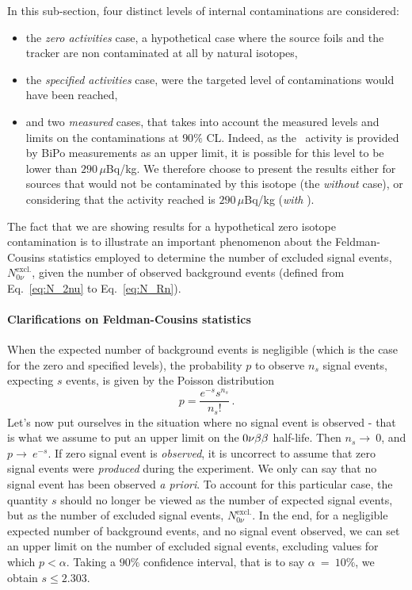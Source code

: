 In this sub-section, four distinct levels of internal contaminations are considered:
\begin{itemize}
\item the \emph{zero activities} case, a hypothetical case where the source foils and the tracker are non contaminated at all by natural isotopes,
\item the \emph{specified activities} case, were the targeted level of contaminations would have been reached,
\item and two \emph{measured} cases,  that takes into account the measured levels and limits on the contaminations at $90\%$ CL.
  Indeed, as the \Bi\ activity is provided by BiPo measurements as an upper limit, it is possible for this level to be lower than $290\,\mu$Bq/kg.
  We therefore choose to present the results either for sources that would not be contaminated by this isotope (the \emph{without \Bi} case), or considering that the activity reached is $290\,\mu$Bq/kg (\emph{with \Bi}).
\end{itemize}
The fact that we are showing results for a hypothetical zero isotope contamination is to illustrate an important phenomenon about the Feldman-Cousins statistics employed to determine the number of excluded signal events, $N_{0\nu}^{\text{excl.}}$, given the number of observed background events (defined from Eq.~\eqref{eq:N_2nu} to Eq.~\eqref{eq:N_Rn}).

\paragraph{Clarifications on Feldman-Cousins statistics}
When the expected number of background events is negligible (which is the case for the zero and specified levels), the probability $p$ to observe $n_{s}$ signal events, expecting $s$ events, is given by the Poisson distribution
\begin{equation}
p = \frac{e^{-s}s^{n_{s}}}{n_{s}!}\,.
\end{equation}
Let's now put ourselves in the situation where no signal event is observed - that is what we assume to put an upper limit on the $0\nu\beta\beta$ half-life.
Then $n_{s}\rightarrow~0$, and $p\rightarrow~e^{-s}$.
If zero signal event is \emph{observed}, it is uncorrect to assume that zero signal events were \emph{produced} during the experiment.
We only can say that no signal event has been observed \emph{a priori}.
To account for this particular case, the quantity $s$ should no longer be viewed as the number of expected signal events, but as the number of excluded signal events, $N_{0\nu}^{\text{excl.}}$.
In the end, for a negligible expected number of background events, and no signal event observed, we can set an upper limit on the number of excluded signal events, excluding values for which $p < \alpha$.
Taking a $90\%$ confidence interval, that is to say $\alpha~=~10\%$, we obtain $s \leq 2.303$.

